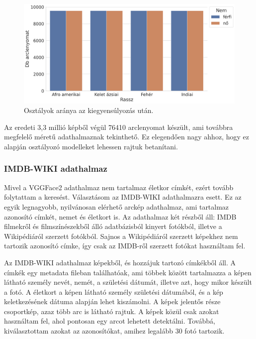 \begin{figure}[ht]
	\centering
	\includegraphics[width=1\columnwidth]{figures/VGG_balanced.png}
	\caption{Osztályok aránya az kiegyensúlyozás után.}
	\label{fig:vgg_ba}
\end{figure}

Az eredeti 3,3 millió képből végül 76410 arclenyomat készült, ami továbbra megfelelő méretű adathalmaznak tekinthető. Ez elegendően nagy ahhoz, hogy ez alapján osztályozó modelleket lehessen rajtuk betanítani.

\subsubsection*{IMDB-WIKI adathalmaz}

Mivel a VGGFace2 adathalmaz nem tartalmaz életkor címkét, ezért tovább folytattam a keresést. Választásom az IMDB-WIKI \cite{imdbwiki2018} adathalmazra esett. Ez az egyik legnagyobb, nyilvánosan elérhető arckép adathalmaz, ami tartalmaz azonosító címkét, nemet és életkort is. Az adathalmaz két részből áll: IMDB filmekről és filmszínészekből álló adatbázisból kinyert fotókból, illetve a Wikipédiáról szerzett fotókból. Sajnos a Wikipédiáról szerzett képekhez nem tartozik azonosító címke, így csak az IMDB-ről szerzett fotókat használtam fel.

Az IMDB-WIKI adathalmaz képekből, és hozzájuk tartozó címkékből áll. A címkék egy metadata fileban találhatóak, ami többek között tartalmazza a képen látható személy nevét, nemét, a születési dátumát, illetve azt, hogy mikor készült a fotó. A életkort a képen látható személy születési dátumából, és a kép keletkezésének dátuma alapján lehet kiszámolni. A képek jelentős része csoportkép, azaz több arc is látható rajtuk. A képek közül csak azokat használtam fel, ahol pontosan egy arcot lehetett detektálni. Továbbá, kiválasztottam azokat az azonosítókat, amihez legalább 30 fotó tartozik.

